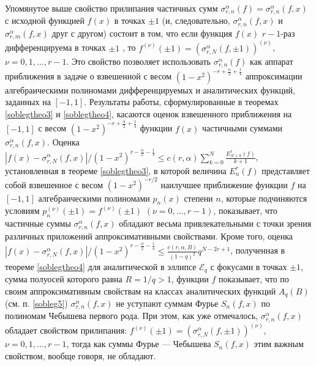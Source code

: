 Упомянутое выше свойство прилипания частичных сумм $\sigma_{r,n}^\alpha(f)=\sigma_{r,n}^\alpha(f,x)$  с исходной функцией $f(x)$ в точках $\pm1$  (и, следовательно, $\sigma_{r,n}^\alpha(f,x)$ и $\sigma_{r,m}^\alpha(f,x)$ друг с другом) состоит в том, что если функция $f(x)$ $r-1$-раз дифференцируема в точках $\pm1$ , то  $f^{(\nu)}(\pm1)=(\sigma_{r,N}^\alpha(f,\pm1))^{(\nu)}$, $\nu=0,1,\ldots, r-1$. Это свойство позволяет использовать $\sigma_{r,n}^\alpha(f)$ как аппарат приближения в задаче о взвешенной с весом $(1-x^2)^{-r+\frac\alpha2+\frac14}$ аппроксимации алгебраическими полиномами дифференцируемых и аналитических функций, заданных на $[-1,1]$. Результаты работы, сформулированные в теоремах \ref{soblegtheo3} и \ref{soblegtheo4}, касаются оценок  взвешенного приближения на $[-1,1]$ с весом $(1-x^2)^{-r+\frac\alpha2+\frac14}$  функции $f(x)$ частичными суммами $\sigma_{r,n}^\alpha(f,x)$. Оценка
$ |f(x)-\sigma_{r,N}^\alpha(f,x)|/(1-x^2)^{r-\frac{\alpha}{2}-\frac14}\le c(r,\alpha)\sum_{k=0}^N\frac{E_{N+k}^r(f)}{k+1}$, установленная в теореме \ref{soblegtheo3}, в которой величина $E_{n}^r(f)$ представляет собой взвешенное с весом $(1-x^2)^{-r/2}$ наилучшее приближение функции $f$ на $[-1,1]$ алгебраическими полиномами $p_n(x)$ степени $n$, которые подчиняются условиям $p_n^{(\nu)}(\pm1)=f^{(\nu)}(\pm1)$ $(\nu=0,\ldots, r-1)$, показывает, что  частичные суммы $\sigma_{r,n}^\alpha(f,x)$ обладают весьма привлекательными с точки зрения различных приложений аппроксимативными свойствами. Кроме того, оценка $|f(x)-\sigma_{r,N}^\alpha(f,x)|/(1-x^2)^{r-\frac{\alpha}{2}-\frac14}\le\frac{c(r,\alpha, B)}{(1-q)^2}q^{N-2r+1}$, полученная в теореме \ref{soblegtheo4} для аналитической в эллипсе $\mathcal{ E}_q$  с фокусами в точках $\pm1$, сумма полуосей которого равна $R=1/q>1$, функции $f$ показывает, что   по своим аппроксимативным свойствам на классах аналитических функций $A_q(B)$ (см. п. \ref{sobleg5}) $\sigma_{r,n}^\alpha(f,x)$ не уступают суммам Фурье $S_n(f,x)$ по полиномам Чебышева первого рода. При этом, как уже отмечалось, $\sigma_{r,n}^\alpha(f,x)$ обладает свойством прилипания:  $f^{(\nu)}(\pm1)=(\sigma_{r,N}^\alpha(f,\pm1))^{(\nu)}$, $\nu=0,1,\ldots, r-1$, тогда как суммы Фурье --- Чебышева $S_n(f,x)$ этим важным свойством, вообще говоря, не обладают.

